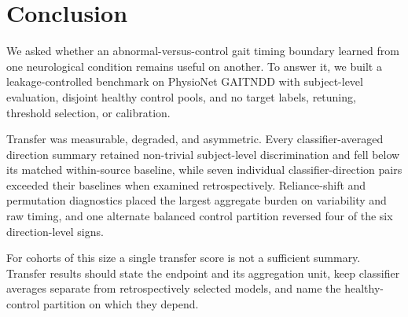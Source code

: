 \documentclass[conference]{IEEEtran}
\begin{document}
\section{Conclusion}
\label{sec:conclusion}
We asked whether an abnormal-versus-control gait timing boundary learned from one neurological condition remains useful on another. To answer it, we built a leakage-controlled benchmark on PhysioNet GAITNDD with subject-level evaluation, disjoint healthy control pools, and no target labels, retuning, threshold selection, or calibration.

Transfer was measurable, degraded, and asymmetric. Every classifier-averaged direction summary retained non-trivial subject-level discrimination and fell below its matched within-source baseline, while seven individual classifier-direction pairs exceeded their baselines when examined retrospectively. Reliance-shift and permutation diagnostics placed the largest aggregate burden on variability and raw timing, and one alternate balanced control partition reversed four of the six direction-level signs.

For cohorts of this size a single transfer score is not a sufficient summary. Transfer results should state the endpoint and its aggregation unit, keep classifier averages separate from retrospectively selected models, and name the healthy-control partition on which they depend.



\end{document}

